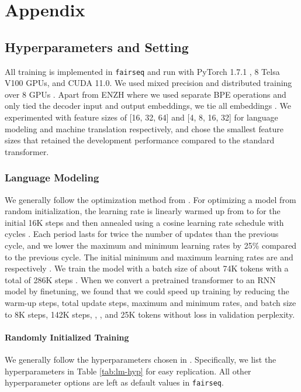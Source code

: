 \documentclass[11pt]{article}
\begin{document}
\section{Appendix}
\subsection{Hyperparameters and Setting}
\label{sec:hyper}
All training is implemented in \texttt{fairseq} \cite{ott-etal-2019-fairseq} and run with PyTorch 1.7.1 \cite{pytorch}, 8 Telsa V100 GPUs, and CUDA 11.0.
We used mixed precision and distributed training over 8 GPUs \cite{micikevicius2018mixed, Ott2018ScalingNM}.
Apart from ENZH where we used separate BPE operations and only tied the decoder input and output embeddings, we tie all embeddings \cite{Press2017UsingTO, Inan2017TyingWV}.
We experimented with feature sizes of [16, 32, 64] and [4, 8, 16, 32] for language modeling and machine translation respectively, and chose the smallest feature sizes that retained the development performance compared to the standard transformer. 

\subsubsection{Language Modeling}
We generally follow the optimization method from \citet{Baevski2019AdaptiveIR}.
For optimizing a model from random initialization, the learning rate is linearly warmed up from  to  for the initial 16K steps and then annealed using a cosine learning rate schedule with cycles \cite{cosine}.
Each period lasts for twice the number of updates than the previous cycle, and we lower the maximum and minimum learning rates by 25\% compared to the previous cycle.
The initial minimum and maximum learning rates are  and  respectively \cite{Baevski2019AdaptiveIR}.
We train the model with a batch size of about 74K tokens with a total of 286K steps \cite{Baevski2019AdaptiveIR}.
When we convert a pretrained transformer to an RNN model by finetuning, we found that we could speed up training by reducing the warm-up steps, total update steps, maximum and minimum rates, and batch size to 8K steps, 142K steps, , , and 25K tokens without loss in validation perplexity.
\paragraph{Randomly Initialized Training}
We generally follow the hyperparameters chosen in \citet{Baevski2019AdaptiveIR,layerdrop}.
Specifically, we list the hyperparameters in Table \ref{tab:lm-hyp} for easy replication. All other hyperparameter options are left as default values in \texttt{fairseq}.
\end{document}
